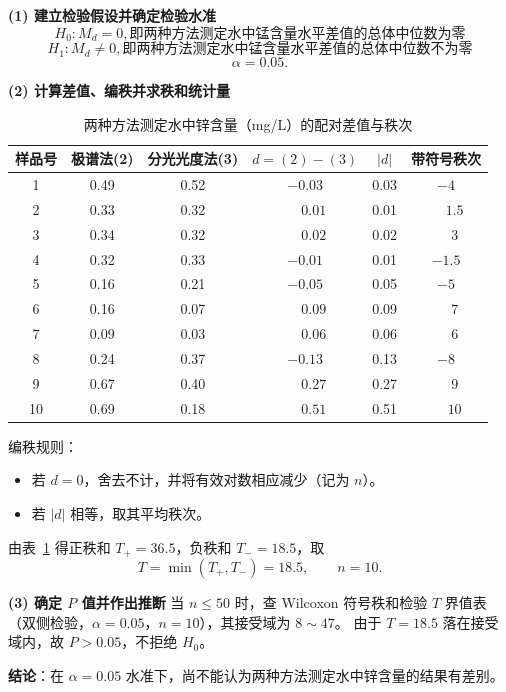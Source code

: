 \documentclass[lang=cn,10pt]{elegantbook}
\begin{document}
\vspace{0.2cm}
\begin{solution}
\textbf{(1) 建立检验假设并确定检验水准}
\[
H_0: M_d = 0 ,即两种方法测定水中锰含量水平差值的总体中位数为零
\]
\[
H_1: M_d \ne 0,即两种方法测定水中锰含量水平差值的总体中位数不为零
\]
\[
\alpha=0.05.
\]

\textbf{(2) 计算差值、编秩并求秩和统计量}
\begin{table}[htbp]
\centering
\caption{两种方法测定水中锌含量（mg/L）的配对差值与秩次}
\label{tab:zn-wilcoxon}
\begin{tabular}{cccccc}
\toprule
样品号 & 极谱法(2) & 分光光度法(3) & $d=(2)-(3)$ & $|d|$ & 带符号秩次 \\
\midrule
1  & 0.49 & 0.52 & $-0.03$ & 0.03 & $-4$ \\
2  & 0.33 & 0.32 & $\phantom{-}0.01$ & 0.01 & $\phantom{-}1.5$ \\
3  & 0.34 & 0.32 & $\phantom{-}0.02$ & 0.02 & $\phantom{-}3$ \\
4  & 0.32 & 0.33 & $-0.01$ & 0.01 & $-1.5$ \\
5  & 0.16 & 0.21 & $-0.05$ & 0.05 & $-5$ \\
6  & 0.16 & 0.07 & $\phantom{-}0.09$ & 0.09 & $\phantom{-}7$ \\
7  & 0.09 & 0.03 & $\phantom{-}0.06$ & 0.06 & $\phantom{-}6$ \\
8  & 0.24 & 0.37 & $-0.13$ & 0.13 & $-8$ \\
9  & 0.67 & 0.40 & $\phantom{-}0.27$ & 0.27 & $\phantom{-}9$ \\
10 & 0.69 & 0.18 & $\phantom{-}0.51$ & 0.51 & $\phantom{-}10$ \\
\bottomrule
\end{tabular}
\end{table}

编秩规则：
\begin{itemize}
    \item 若 $d=0$，舍去不计，并将有效对数相应减少（记为 $n$）。
    \item 若 $|d|$ 相等，取其平均秩次。
\end{itemize}

由表~\ref{tab:zn-wilcoxon} 得正秩和 $T_+=36.5$，负秩和 $T_-=18.5$，取
\[
T=\min(T_+,T_-)=18.5,\qquad n=10.
\]

\textbf{(3) 确定 $P$ 值并作出推断}
当 $n\le 50$ 时，查 Wilcoxon 符号秩和检验 $T$ 界值表（双侧检验，$\alpha=0.05$，$n=10$），其接受域为 $8\sim 47$。
由于 $T=18.5$ 落在接受域内，故 $P>0.05$，不拒绝 $H_0$。

\textbf{结论}：在 $\alpha=0.05$ 水准下，尚不能认为两种方法测定水中锌含量的结果有差别。
\end{solution}
\end{document}
